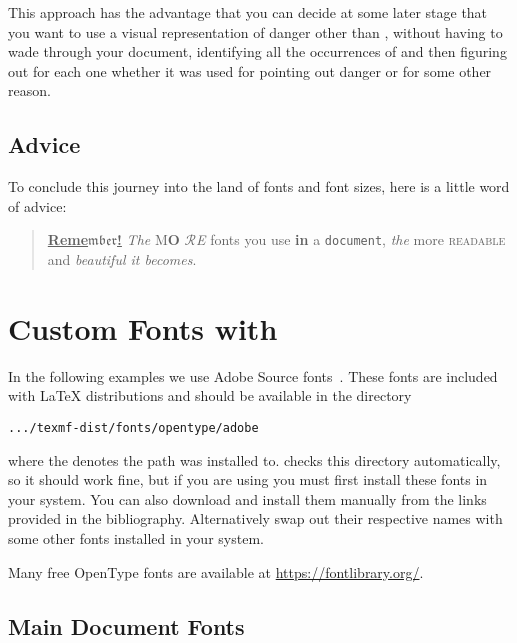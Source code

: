 This approach has the advantage that you can decide at some later
stage that you want to use a visual representation of danger other
than , without having to wade through your document,
identifying all the occurrences of  and then figuring out
for each one whether it was used for pointing out danger or for some other
reason.

\subsection{Advice}

To conclude this journey into the land of fonts and font sizes,
here is a little word of advice:\nopagebreak

\begin{quote}
  \underline{\textbf{Reme\(\mathfrak{mber}\)\Huge!}} \textit{The}
  \textsf{M\textbf{\LARGE O} \(\mathcal{R}\)\textsl{E}} fonts \Huge you
  \tiny use \footnotesize \textbf{in} a \small \texttt{document},
  \large \textit{the} \normalsize more \textsc{readable} and
  \textsl{\textsf{beautiful} it bec\large o\Large m\LARGE e\huge s}.
\end{quote}

\section{Custom Fonts with }\label{sec:fontspec}

In the following examples we use Adobe Source fonts~\cites{sourceserif,
  sourcesans, sourcecodepro}. These fonts are included with \TeXLive{} \LaTeX{}
distributions and should be available in the directory
\begin{code}
  \nolinkurl{.../texmf-dist/fonts/opentype/adobe}
\end{code}
where the  denotes the path \TeXLive{} was installed to.
 checks this directory automatically, so it should work fine,
but if you are using  you must first install these fonts in your
system. You can also download and install them manually from the links provided
in the bibliography. Alternatively swap out their respective names with some other
fonts installed in your system.

Many free OpenType fonts are available at \url{https://fontlibrary.org/}.

\subsection{Main Document Fonts}

